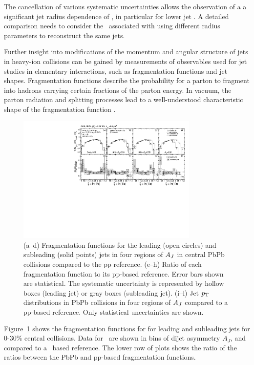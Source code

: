 The cancellation of various systematic uncertainties allows the observation of a 
a significant jet radius dependence of \Rcp, in particular for
lower jet \pT. A detailed comparison needs to consider the \pT\ associated with
using different radius parameters to reconstruct the same jets.

Further insight into modifications of the momentum and angular structure
of jets in heavy-ion collisions can be gained by measurements of 
observables used for jet studies in elementary interactions, such as 
fragmentation functions and jet shapes.
Fragmentation functions describe the probability for a parton to fragment into
hadrons carrying certain fractions of the parton energy. 
In vacuum, the parton radiation and splitting processes lead to a
well-understood characteristic shape of the fragmentation function \cite{Dokshitzer:1991wu}.

\begin{figure}[!h]
\begin{center}
\includegraphics[width=0.8\textwidth]{jetfigures/xsi_div_both_effv9_l100s40_0to12_dphi20eta20dr3pt4id1_cwt_ppDiv_gray.pdf}
\caption{(a--d) Fragmentation functions for the leading (open circles) and subleading (solid points) jets in four regions of $A_J$ in central PbPb collisions compared to the pp reference.
(e--h) Ratio of each fragmentation function to its pp-based reference.
Error bars shown are statistical. The systematic uncertainty is
represented by hollow boxes (leading jet) or gray boxes (subleading jet).
(i--l) Jet $\mbox{$p_{\mathrm{T}}$}$ distributions in PbPb collisions in four regions of $A_J$ 
compared to a pp-based reference. Only statistical uncertainties are shown.
}

\label{fig:GR:CMS_jetFF}
\end{center}
\end{figure}
Figure~\ref{fig:GR:CMS_jetFF} shows the fragmentation functions for
for leading and subleading jets for 0-30\% central collisions. Data for \PbPb\ are shown in 
bins of dijet asymmetry $A_J$, and compared to a \pp\ based reference.
The lower row of plots shows the ratio of the ratios between the PbPb 
and pp-based fragmentation functions.

